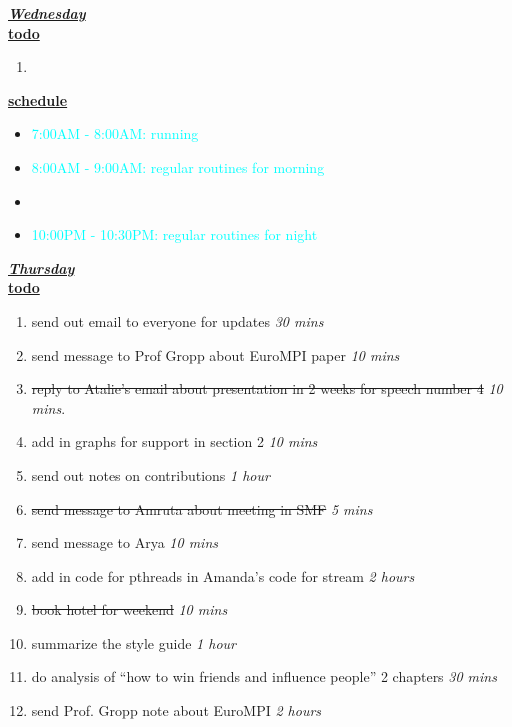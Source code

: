 \documentclass[8pt]{article}
\newcommand{\doneTask}[1]{\item \sout{#1}}
\newcommand{\timeEst}[1]{\textit{#1}}
\newcommand{\regItem}[1]{\item \textcolor{cyan}{#1}}
\begin{document}
\underline{\textbf{\textit{Wednesday}}}\\
\underline{\textbf{todo}}\\
\begin{enumerate}
\item
\end{enumerate}
\underline{\textbf{schedule}}\\
\begin{itemize}
\regItem{7:00AM - 8:00AM: running}
\regItem{8:00AM - 9:00AM: regular routines for morning}
\item
\regItem{10:00PM - 10:30PM: regular routines for night}
\end{itemize}

\underline{\textbf{\textit{Thursday}}}\\
\underline{\textbf{todo}}\\
\begin{enumerate}
\item send out email to everyone for updates \timeEst{30 mins}
\item send message to Prof Gropp about EuroMPI paper \timeEst{10 mins}
\doneTask{ reply to Atalie's email about presentation in 2 weeks for speech
number 4 } \timeEst{10 mins}.
\item add in graphs for support in section 2 \timeEst{10 mins}
\item send out notes on contributions \timeEst{1 hour}
\doneTask{send message to Amruta about meeting in SMF} \timeEst{5 mins}
\item send message to Arya \timeEst{10 mins}
\item add in code for pthreads in Amanda's code for stream \timeEst{2 hours}
\doneTask{book hotel for weekend }\timeEst{10 mins}
\item summarize the style guide  \timeEst{1 hour}
\item do analysis of ``how to win friends and influence people'' 2 chapters \timeEst{30 mins}
\item send Prof. Gropp note about EuroMPI \timeEst{2 hours}
\end{enumerate}
\end{document}
